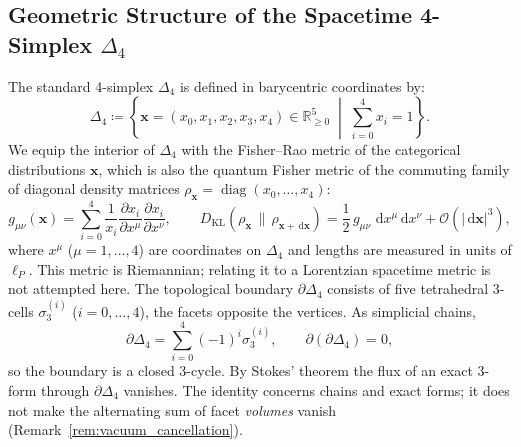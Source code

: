 \documentclass[11pt,a4paper,reqno]{amsart}
\theoremstyle{definition}
\numberwithin{equation}{section}
\newcommand{\R}{\mathbb{R}}
\newcommand{\dif}{\,\mathrm{d}}
\begin{document}
\subsection{Geometric Structure of the Spacetime 4-Simplex \texorpdfstring{$\Delta_4$}{Delta4}}
The standard 4-simplex $\Delta_4$ is defined in barycentric coordinates by:
\begin{equation}
    \label{eq:delta4_def}
    \Delta_4 \coloneqq \left\{ \mathbf{x} = (x_0, x_1, x_2, x_3, x_4) \in \R_{\ge 0}^5 \;\middle|\; \sum_{i=0}^4 x_i = 1 \right\}.
\end{equation}
We equip the interior of $\Delta_4$ with the Fisher--Rao metric of the categorical distributions $\mathbf{x}$, which is also the quantum Fisher metric of the commuting family of diagonal density matrices $\rho_{\mathbf{x}} = \operatorname{diag}(x_0, \dots, x_4)$:
\begin{equation}
    \label{eq:qfi_metric}
    g_{\mu\nu}(\mathbf{x}) = \sum_{i=0}^4 \frac{1}{x_i} \frac{\partial x_i}{\partial x^\mu} \frac{\partial x_i}{\partial x^\nu}, \qquad D_{\mathrm{KL}}(\rho_{\mathbf{x}} \,\|\, \rho_{\mathbf{x} + \dif \mathbf{x}}) = \frac{1}{2}\, g_{\mu\nu}\, \dif x^\mu \dif x^\nu + \mathcal{O}(|\dif\mathbf{x}|^3),
\end{equation}
where $x^\mu$ ($\mu = 1, \dots, 4$) are coordinates on $\Delta_4$ and lengths are measured in units of $\ell_P$. This metric is Riemannian; relating it to a Lorentzian spacetime metric is not attempted here.
The topological boundary $\partial \Delta_4$ consists of five tetrahedral 3-cells $\sigma_3^{(i)}$ ($i = 0, \dots, 4$), the facets opposite the vertices. As simplicial chains,
\begin{equation}
    \label{eq:boundary_homology}
    \partial \Delta_4 = \sum_{i=0}^4 (-1)^i \sigma_3^{(i)}, \qquad \partial(\partial \Delta_4) = 0,
\end{equation}
so the boundary is a closed 3-cycle. By Stokes' theorem the flux of an exact 3-form through $\partial\Delta_4$ vanishes. The identity concerns chains and exact forms; it does not make the alternating sum of facet \emph{volumes} vanish (Remark~\ref{rem:vacuum_cancellation}).
\end{document}
